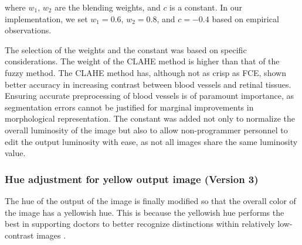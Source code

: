 where $w_{1}$, $w_{2}$ are the blending weights, and $c$ is a constant. In our implementation, we set $w_{1} = 0.6$, $w_{2} =  0.8$, and $c = -0.4$ based on empirical observations.

The selection of the weights and the constant was based on specific considerations. The weight of the CLAHE method is higher than that of the fuzzy method. The CLAHE method has, although not as crisp as FCE, shown better accuracy in increasing contrast between blood vessels and retinal tissues.  Ensuring accurate preprocessing of blood vessels is of paramount importance, as segmentation errors cannot be justified for marginal improvements in morphological representation. The constant was added not only to normalize the overall luminosity of the image but also to allow non-programmer personnel to edit the output luminosity with ease, as not all images share the same luminosity value.

\subsubsection{Hue adjustment for yellow output image (Version 3)}
\label{subsec:version_3}
The hue of the output of the image is finally modified so that the overall color of the image has a yellowish hue. This is because the yellowish hue performs the best in supporting doctors to better recognize distinctions within relatively low-contrast images \cite{oguraComparisonGrayscaleColorscale2017}.